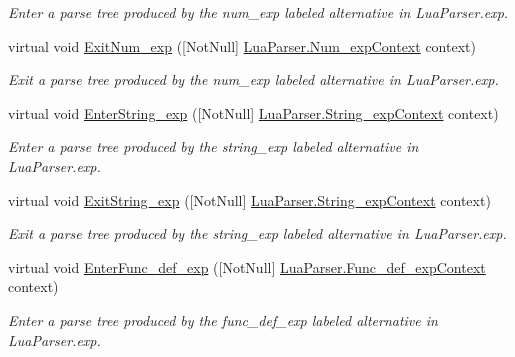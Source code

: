 \begin{DoxyCompactItemize}
\begin{DoxyCompactList}\small\item\em Enter a parse tree produced by the {\ttfamily num\+\_\+exp} labeled alternative in Lua\+Parser.\+exp. \end{DoxyCompactList}\item 
virtual void \mbox{\hyperlink{classzlua_1_1_lua_base_listener_a450c13a6c541dd5eed0c0713fdf81343}{Exit\+Num\+\_\+exp}} (\mbox{[}Not\+Null\mbox{]} \mbox{\hyperlink{classzlua_1_1_lua_parser_1_1_num__exp_context}{Lua\+Parser.\+Num\+\_\+exp\+Context}} context)
\begin{DoxyCompactList}\small\item\em Exit a parse tree produced by the {\ttfamily num\+\_\+exp} labeled alternative in Lua\+Parser.\+exp. \end{DoxyCompactList}\item 
virtual void \mbox{\hyperlink{classzlua_1_1_lua_base_listener_aba9f9054eb0fce5f9e2108c03098b28a}{Enter\+String\+\_\+exp}} (\mbox{[}Not\+Null\mbox{]} \mbox{\hyperlink{classzlua_1_1_lua_parser_1_1_string__exp_context}{Lua\+Parser.\+String\+\_\+exp\+Context}} context)
\begin{DoxyCompactList}\small\item\em Enter a parse tree produced by the {\ttfamily string\+\_\+exp} labeled alternative in Lua\+Parser.\+exp. \end{DoxyCompactList}\item 
virtual void \mbox{\hyperlink{classzlua_1_1_lua_base_listener_ac4f5a6a5139a8c670bb8f075a8fc3782}{Exit\+String\+\_\+exp}} (\mbox{[}Not\+Null\mbox{]} \mbox{\hyperlink{classzlua_1_1_lua_parser_1_1_string__exp_context}{Lua\+Parser.\+String\+\_\+exp\+Context}} context)
\begin{DoxyCompactList}\small\item\em Exit a parse tree produced by the {\ttfamily string\+\_\+exp} labeled alternative in Lua\+Parser.\+exp. \end{DoxyCompactList}\item 
virtual void \mbox{\hyperlink{classzlua_1_1_lua_base_listener_ace1992dcf21cf3eff2428f67de5f3595}{Enter\+Func\+\_\+def\+\_\+exp}} (\mbox{[}Not\+Null\mbox{]} \mbox{\hyperlink{classzlua_1_1_lua_parser_1_1_func__def__exp_context}{Lua\+Parser.\+Func\+\_\+def\+\_\+exp\+Context}} context)
\begin{DoxyCompactList}\small\item\em Enter a parse tree produced by the {\ttfamily func\+\_\+def\+\_\+exp} labeled alternative in Lua\+Parser.\+exp. \end{DoxyCompactList}\item 

\end{DoxyCompactItemize}
